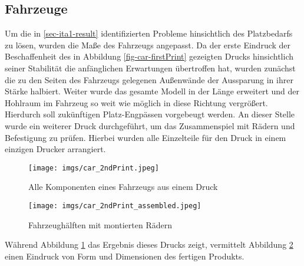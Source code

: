 \documentclass[.../Dokumentation.tex]{subfiles}
\begin{document}
\subsection{Fahrzeuge}\label{sec-ita2-cars}
Um die in \ref{sec-ita1-result} identifizierten Probleme hinsichtlich des 
Platzbedarfs zu lösen, wurden die Maße des Fahrzeugs angepasst.
Da der erste Eindruck der Beschaffenheit des in Abbildung 
\ref{fig-car-firstPrint} gezeigten Drucks hinsichtlich seiner Stabilität 
die anfänglichen Erwartungen übertroffen hat, wurden zunächst die zu den Seiten 
des Fahrzeugs gelegenen Außenwände der Aussparung in ihrer Stärke halbiert.
Weiter wurde das gesamte Modell in der Länge erweitert und der Hohlraum im 
Fahrzeug so weit wie möglich in diese Richtung vergrößert. Hierdurch soll 
zukünftigen Platz-Engpässen vorgebeugt werden. An dieser Stelle wurde ein weiterer Druck durchgeführt, um das 
Zusammenspiel mit Rädern und Befestigung zu prüfen. Hierbei wurden alle 
Einzelteile für den Druck in einem einzigen Drucker arrangiert.
\begin{figure}[H]
\begin{center}
    \texttt{[image: imgs/car\_2ndPrint.jpeg]}
    \caption{Alle Komponenten eines Fahrzeugs aus einem Druck}
    \label{fig-car-2ndPrint}
\end{center}
\end{figure}
\begin{figure}[H]
\begin{center}
    \texttt{[image: imgs/car\_2ndPrint\_assembled.jpeg]}
    \vspace*{-2.75cm}
    \caption{Fahrzeughälften mit montierten Rädern}
    \label{fig-car-2ndPrint-assembled}
\end{center}
\end{figure}
\noindent
Während Abbildung \ref{fig-car-2ndPrint} das Ergebnis dieses Drucks zeigt, 
vermittelt Abbildung \ref{fig-car-2ndPrint-assembled} einen Eindruck 
von Form und Dimensionen des fertigen Produkts.
\end{document}
